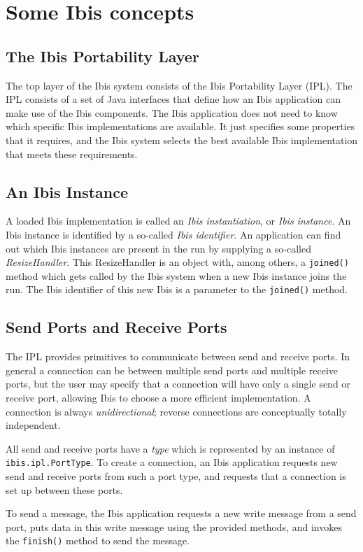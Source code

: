 \documentclass[10pt]{article}
\newcommand{\mysection}[1]{\section{#1}\label{#1}}
\newcommand{\mysubsection}[1]{\subsection{#1}\label{#1}}
\begin{document}
\mysection{Some Ibis concepts}

\mysubsection{The Ibis Portability Layer}

The top layer of the Ibis system consists of the Ibis Portability Layer (IPL).
The IPL consists of a set of Java interfaces that define how an Ibis application
can make use of the Ibis components.
The Ibis application does not need to know which specific Ibis implementations are
available.
It just specifies some properties that it requires, and the Ibis system
selects the best available Ibis implementation that meets these requirements.
 
\mysubsection{An Ibis Instance}

A loaded Ibis implementation is called an \emph{Ibis instantiation}, or 
\emph{Ibis instance}.
An Ibis instance is identified by a so-called
\emph{Ibis identifier}.
An application can find out which Ibis instances are present in the run
by supplying a so-called \emph{ResizeHandler}.
This ResizeHandler is an object with, among others, a \texttt{joined()}
method which gets called by the Ibis system when a new Ibis instance
joins the run.  The Ibis identifier of this new Ibis is a parameter
to the \texttt{joined()} method.

\mysubsection{Send Ports and Receive Ports}

The IPL provides primitives to communicate between send and receive ports.
In general a connection can be between multiple send ports and multiple
receive ports, but the user may specify that a connection will have only
a single send or receive port, allowing Ibis to choose a more efficient
implementation.  A connection is always \emph{unidirectional}; reverse
connections are conceptually totally independent.

All send and receive ports have a \emph{type} which is represented by an
instance of \texttt{ibis.ipl.PortType}.
To create a connection, an Ibis application requests new send and receive
ports from such a port type, and requests that a connection is set up 
between these ports.

To send a message, the Ibis application requests a new write message from
a send port, puts data in this write message using the provided methods,
and invokes the \texttt{finish()} method to send the message.
\end{document}
